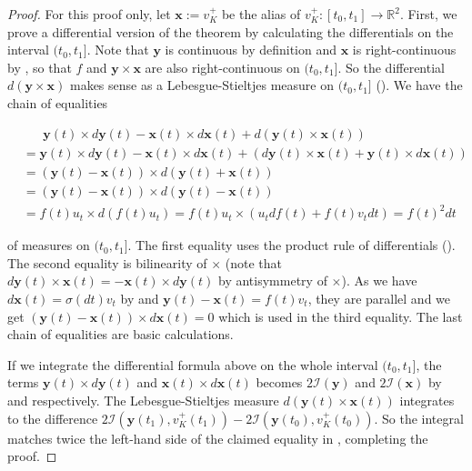 \begin{proof}
For this proof only, let \(\mathbf{x} := v_K^+\) be the alias of \(v_K^+ : [t_0, t_1] \to \mathbb{R}^2\). First, we prove a differential version of the theorem by calculating the differentials on the interval \((t_0, t_1]\). Note that \(\mathbf{y}\) is continuous by definition and \(\mathbf{x}\) is right-continuous by , so that \(f\) and \(\mathbf{y} \times \mathbf{x}\) are also right-continuous on \((t_0, t_1]\). So the differential \(d(\mathbf{y} \times \mathbf{x})\) makes sense as a Lebesgue-Stieltjes measure on \((t_0, t_1]\) (). We have the chain of equalities

\begin{align*}
& \phantom{{} = .} \mathbf{y}(t) \times d \mathbf{y}(t) - \mathbf{x}(t) \times d \mathbf{x}(t) + d \left( \mathbf{y}(t) \times \mathbf{x}(t) \right)  \\
& = \mathbf{y}(t) \times d \mathbf{y}(t) - \mathbf{x}(t) \times d \mathbf{x}(t) + \left( d \mathbf{y}(t) \times \mathbf{x}(t) + \mathbf{y}(t) \times d \mathbf{x} (t) \right)  \\
& = \left( \mathbf{y}(t) - \mathbf{x}(t) \right) \times d\left( \mathbf{y}(t) + \mathbf{x}(t) \right)  \\
& = \left( \mathbf{y}(t) - \mathbf{x}(t) \right) \times d\left( \mathbf{y}(t) - \mathbf{x}(t) \right)  \\
& = f(t) u_t \times d\left( f(t) u_t \right) = f(t) u_t \times ( u_t df(t) + f(t) v_t dt) = f(t)^2 dt
\end{align*}

of measures on \((t_0, t_1]\). The first equality uses the product rule of differentials (). The second equality is bilinearity of \(\times\) (note that \(d \mathbf{y}(t) \times \mathbf{x}(t) = - \mathbf{x}(t) \times d \mathbf{y}(t)\) by antisymmetry of \(\times\)). As we have \(d \mathbf{x}(t) = \sigma(dt)v_t\) by  and \(\mathbf{y}(t) - \mathbf{x}(t) = f(t)v_t\), they are parallel and we get \((\mathbf{y}(t) - \mathbf{x}(t)) \times d \mathbf{x}(t) = 0\) which is used in the third equality. The last chain of equalities are basic calculations.

If we integrate the differential formula above on the whole interval \((t_0, t_1]\), the terms \(\mathbf{y}(t) \times d \mathbf{y}(t)\) and \(\mathbf{x}(t) \times d \mathbf{x}(t)\) becomes \(2 \mathcal{I}(\mathbf{y})\) and \(2 \mathcal{I}(\mathbf{x})\) by  and  respectively. The Lebesgue-Stieltjes measure \(d(\mathbf{y}(t) \times \mathbf{x}(t))\) integrates to the difference \(2 \mathcal{I} \left( \mathbf{y}(t_1), v_K^+(t_1) \right) - 2 \mathcal{I} \left( \mathbf{y}(t_0), v_K^+(t_0) \right)\). So the integral matches twice the left-hand side of the claimed equality in , completing the proof.
\end{proof}


